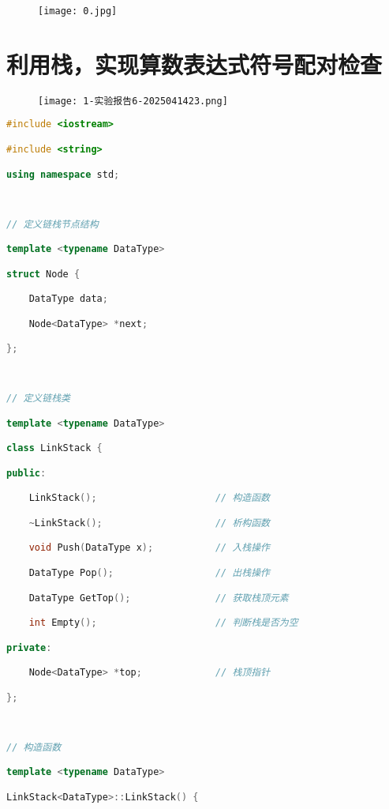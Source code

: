 \begin{figure}[H]
\centering
\texttt{[image: 0.jpg]}
\label{}
\end{figure}

\section{利用栈，实现算数表达式符号配对检查}

\begin{figure}[H]
\centering
\texttt{[image: 1-实验报告6-2025041423.png]}
\label{}
\end{figure}

\begin{lstlisting}[language=C++]
#include <iostream>

#include <string>

using namespace std;

  

// 定义链栈节点结构

template <typename DataType>

struct Node {

    DataType data;

    Node<DataType> *next;

};

  

// 定义链栈类

template <typename DataType>

class LinkStack {

public:

    LinkStack();                     // 构造函数

    ~LinkStack();                    // 析构函数

    void Push(DataType x);           // 入栈操作

    DataType Pop();                  // 出栈操作

    DataType GetTop();               // 获取栈顶元素

    int Empty();                     // 判断栈是否为空

private:

    Node<DataType> *top;             // 栈顶指针

};

  

// 构造函数

template <typename DataType>

LinkStack<DataType>::LinkStack() {


\end{lstlisting}
